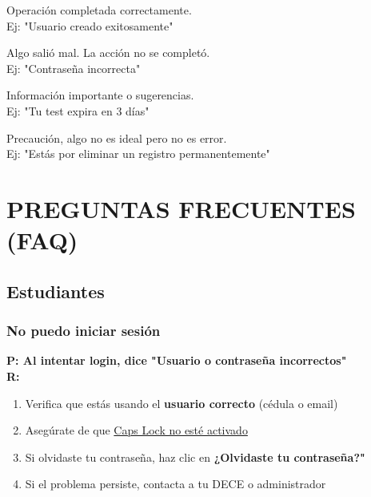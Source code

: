 \documentclass[12pt, a4paper]{report}
\begin{document}
\begin{tcolorbox}[colback=successgreen!10, colframe=successgreen, title=ÉXITO (Verde)]
Operación completada correctamente.\\
Ej: "Usuario creado exitosamente"
\end{tcolorbox}

\begin{tcolorbox}[colback=dangerred!10, colframe=dangerred, title=ERROR (Rojo)]
Algo salió mal. La acción no se completó.\\
Ej: "Contraseña incorrecta"
\end{tcolorbox}

\begin{tcolorbox}[colback=infoblue!10, colframe=infoblue, title=INFO (Azul)]
Información importante o sugerencias.\\
Ej: "Tu test expira en 3 días"
\end{tcolorbox}

\begin{tcolorbox}[colback=warningorange!10, colframe=warningorange, title=ADVERTENCIA (Amarillo)]
Precaución, algo no es ideal pero no es error.\\
Ej: "Estás por eliminar un registro permanentemente"
\end{tcolorbox}

\chapter{PREGUNTAS FRECUENTES (FAQ)}

\section{Estudiantes}

\subsection{No puedo iniciar sesión}
\textbf{P: Al intentar login, dice "Usuario o contraseña incorrectos"}\\
\textbf{R:}
\begin{enumerate}
    \item Verifica que estás usando el \textbf{usuario correcto} (cédula o email)
    \item Asegúrate de que \underline{Caps Lock no esté activado}
    \item Si olvidaste tu contraseña, haz clic en \textbf{¿Olvidaste tu contraseña?"}
    \item Si el problema persiste, contacta a tu DECE o administrador
\end{enumerate}
\end{document}
